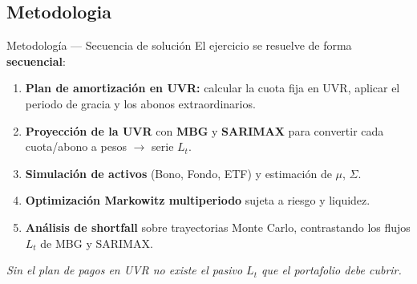 \documentclass[10pt]{beamer}
\begin{document}
\subsection{Metodologia}

\begin{frame}{Metodología — Secuencia de solución}
\small
El ejercicio se resuelve de forma \textbf{secuencial}:

\begin{enumerate}
    \item \textbf{Plan de amortización en UVR:} calcular la cuota fija en UVR,
          aplicar el periodo de gracia y los abonos extraordinarios.
    \item \textbf{Proyección de la UVR} con \textbf{MBG} y \textbf{SARIMAX}
          para convertir cada cuota/abono a pesos \(\rightarrow\) serie \(L_t\).
    \item \textbf{Simulación de activos} (Bono, Fondo, ETF) y estimación de \(\mu\), \(\Sigma\).
    \item \textbf{Optimización Markowitz multiperiodo} sujeta a riesgo y liquidez.
    \item \textbf{Análisis de shortfall} sobre trayectorias Monte Carlo,
          contrastando los flujos \(L_t\) de MBG y SARIMAX.
\end{enumerate}

\vspace{0.2cm}
\begin{center}
\textit{Sin el plan de pagos en UVR no existe el pasivo \(L_t\) que el portafolio debe cubrir.}
\end{center}
\end{frame}
\end{document}
